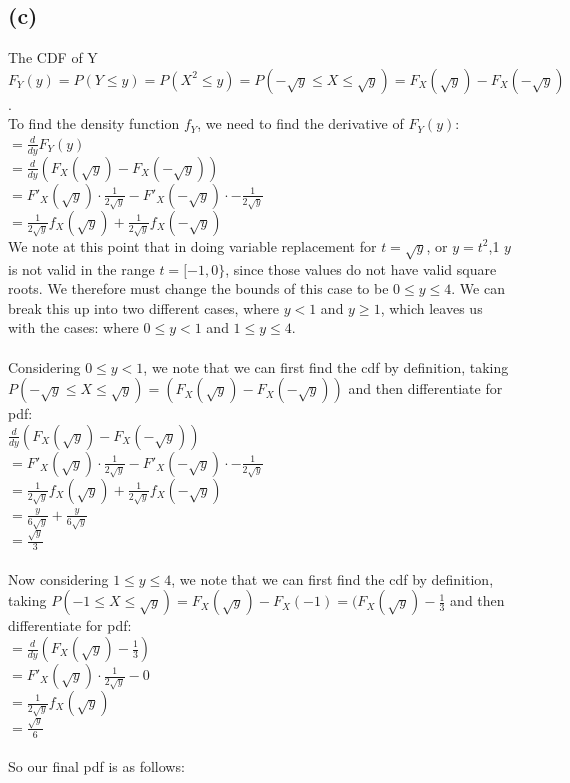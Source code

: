 \documentclass{article}
\begin{document}
{\subsection*{(c)}
The CDF of Y $F_Y(y) = P(Y \leq y) = P(X^2 \leq y) = P(-\sqrt{y} \leq X \leq \sqrt{y}) = F_X(\sqrt{y}) - F_X(-\sqrt{y})$. \\
To find the density function $f_Y$, we need to find the derivative of $F_Y(y)$: \\
$= \frac{d}{dy}F_Y(y)$ \\ 
$= \frac{d}{dy}(F_X(\sqrt{y}) - F_X(-\sqrt{y})) $ \\ 
$= {F'}_X(\sqrt{y}) \cdot \frac{1}{2\sqrt{y}} - {F'}_X(-\sqrt{y}) \cdot -\frac{1}{2\sqrt{y}}$ \\
$ = \frac{1}{2\sqrt{y}}f_X(\sqrt{y}) + \frac{1}{2\sqrt{y}}f_X(-\sqrt{y})$ \\ 
We note at this point that in doing variable replacement for $t = \sqrt{y}$, or $y = t^2$,1 $y$ is not valid in the range $t = [-1, 0\}$, since those values do not have valid square roots. We therefore must change the bounds of this case to be $0 \leq y \leq 4$. We can break this up into two different cases, where $y < 1$ and $y \geq 1$, which leaves us with the cases: where $0 \leq y < 1$ and $1 \leq y \leq 4$. \\ \\ Considering $0 \leq y < 1$, we note that we can first find the cdf by definition, taking $P(-\sqrt{y} \leq X \leq \sqrt{y}) = (F_X(\sqrt{y}) - F_X(-\sqrt{y}))$ and then differentiate for pdf: \\
$\frac{d}{dy}(F_X(\sqrt{y}) - F_X(-\sqrt{y})) $ \\  
$= {F'}_X(\sqrt{y}) \cdot \frac{1}{2\sqrt{y}} - {F'}_X(-\sqrt{y}) \cdot -\frac{1}{2\sqrt{y}}$ \\
$ = \frac{1}{2\sqrt{y}}f_X(\sqrt{y}) + \frac{1}{2\sqrt{y}}f_X(-\sqrt{y})$ \\ 
$= \frac{y}{6\sqrt{y}} + \frac{y}{6\sqrt{y}}$ \\ 
$= \frac{\sqrt{y}}{3}$ \\ 
\\ Now considering $1 \leq y \leq 4$, we note that we can first find the cdf by definition, taking $P(-1 \leq X \leq \sqrt{y}) = F_X(\sqrt{y}) - F_X(-1) = (F_X(\sqrt{y}) - \frac{1}{3} $ and then differentiate for pdf: \\
$= \frac{d}{dy}(F_X(\sqrt{y}) - \frac{1}{3}) $ \\ 
$= {F'}_X(\sqrt{y}) \cdot \frac{1}{2\sqrt{y}} - 0$ \\
$= \frac{1}{2\sqrt{y}}f_X(\sqrt{y})$ \\ 
$= \frac{\sqrt{y}}{6}$ \\ \\
So our final pdf is as follows:

}
\end{document}
